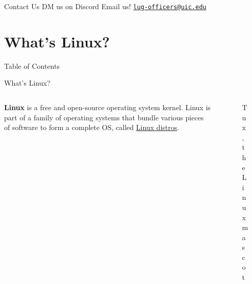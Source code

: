 \documentclass{beamer}
\begin{document}
\begin{frame}{Contact Us}
	\Huge DM us on Discord
	\Huge Email us!
	\href{mailto:lug-officers@uic.edu}{\texttt{lug-officers@uic.edu}}
\end{frame}

\section{What's Linux?}
\begin{frame}{Table of Contents}
	\tableofcontents[currentsection]
\end{frame}

\begin{frame}{What's Linux?}
	\begin{columns}
		\begin{column}{0.5\textwidth}
			\textbf{Linux} is a free and open-source operating
			system kernel. Linux is part of a family of operating
			systems that bundle various pieces of software to form
			a complete OS, called \underline{Linux distros}.
		\end{column}
		\begin{column}{0.5\textwidth}
			\begin{figure}
				\centering
				
				\caption{Tux, the Linux mascot}
			\end{figure}
		\end{column}
	\end{columns}
\end{frame}
\end{document}
